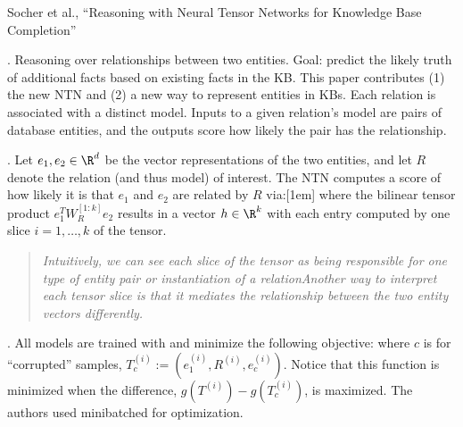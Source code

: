 \documentclass[11pt]{article}
\newcommand\myspace[1][]{\vspace{#1\bigskipamount}}
\newcommand\p{\Needspace{10\baselineskip} \noindent}
\begin{document}

\vspace{-1em}
{\footnotesize Socher et al., ``Reasoning with Neural Tensor Networks for Knowledge Base Completion''}

\p {}. Reasoning over relationships between two entities. Goal: predict the likely truth of additional facts based on existing facts in the KB. This paper contributes (1) the new NTN and (2) a new way to represent entities in KBs. Each relation is associated with a distinct model. Inputs to a given relation's model are pairs of database entities, and the outputs score how likely the pair has the relationship.

\myspace
\p {}. Let $e_1, e_2 \in \R^d$ be the vector representations of the two entities, and let $R$ denote the relation (and thus model) of interest. The NTN computes a score of how likely it is that $e_1$ and $e_2$ are related by $R$ via:[1em]
where the bilinear tensor product $e_1^T W_R^{[1:k]} e_2$ results in a vector $h \in \R^k$ with each entry computed by one slice $i = 1,\ldots,k$ of the tensor.
\begin{quote}
	{\itshape Intuitively, we can see each slice of the tensor as being responsible for one type of entity pair or instantiation
of a relation\textellipsis Another way to interpret each tensor slice is that it mediates the relationship between the two entity vectors differently.}
\end{quote}

\myspace
\p {}. All models are trained with  and minimize the following objective:
where $c$ is for ``corrupted'' samples, $T_c^{(i)} := \left(e_1^{(i)}, R^{(i)}, e_c^{(i)}\right)$. Notice that this function is minimized when the difference, $g\left( T^{(i)} \right) - g\left( T_c^{(i)} \right)$, is maximized. The authors used minibatched  for optimization.
\end{document}
